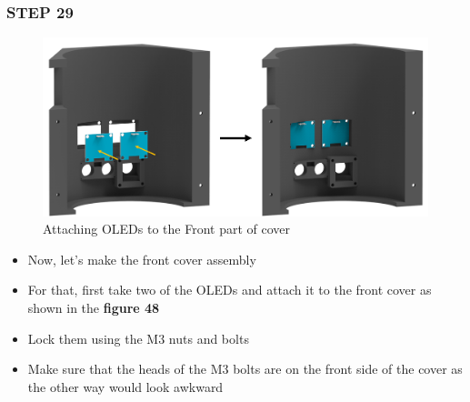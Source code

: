 \documentclass[12pt,a4paper,oneside]{book}
\begin{document}
			\subsubsection*{STEP 29}
				\begin{figure}[H]
					\begin{center}
						\includegraphics[scale=0.5]{ATTACHING OLED}
						\caption{Attaching OLEDs to the Front part of cover}
					\end{center}
				\end{figure}
				\begin{itemize}
					\item Now, let's make the front cover assembly
					\item For that, first take two of the OLEDs and attach it to the front cover as shown in the \textbf{figure 48}
					\item Lock them using the M3 nuts and bolts 
					\item Make sure that the heads of the M3 bolts are on the front side of the cover as the other way would look awkward 
				\end{itemize}
				
\end{document}
